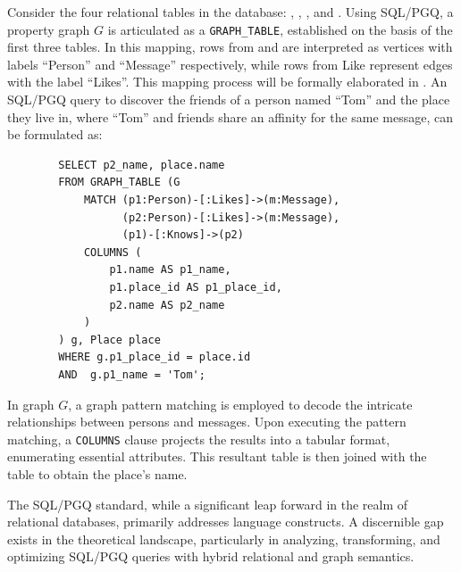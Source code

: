 \begin{example}
    \label{ex:introduction:sqlpgq}
    Consider the four relational tables in the database: , , , and . Using SQL/PGQ, a property graph $G$ is articulated as a \lstinline{GRAPH_TABLE}, established on the basis of the first three tables. In this mapping, rows from  and  are interpreted as vertices with labels ``Person'' and ``Message'' respectively, while rows from Like represent edges with the label ``Likes''. This mapping process will be formally elaborated in . An SQL/PGQ query to discover the friends of a person named ``Tom'' and the place they live in, where ``Tom'' and friends share an affinity for the same message, can be formulated as:
    \begin{lstlisting}
        SELECT p2_name, place.name
        FROM GRAPH_TABLE (G
            MATCH (p1:Person)-[:Likes]->(m:Message),
                  (p2:Person)-[:Likes]->(m:Message),
                  (p1)-[:Knows]->(p2)
            COLUMNS (
                p1.name AS p1_name,
                p1.place_id AS p1_place_id,
                p2.name AS p2_name
            )
        ) g, Place place
        WHERE g.p1_place_id = place.id
        AND  g.p1_name = 'Tom';
    \end{lstlisting}
    In graph $G$, a graph pattern matching is employed to decode the intricate relationships between persons and messages. Upon executing the pattern matching, a \lstinline{COLUMNS} clause projects the results into a tabular format, enumerating essential attributes. This resultant table is then joined with the  table to obtain the place's name.
\end{example}

The SQL/PGQ standard, while a significant leap forward in the realm of relational databases, primarily addresses language constructs. A discernible gap exists in the theoretical landscape, particularly in analyzing, transforming, and optimizing SQL/PGQ queries with hybrid relational and graph semantics. %


